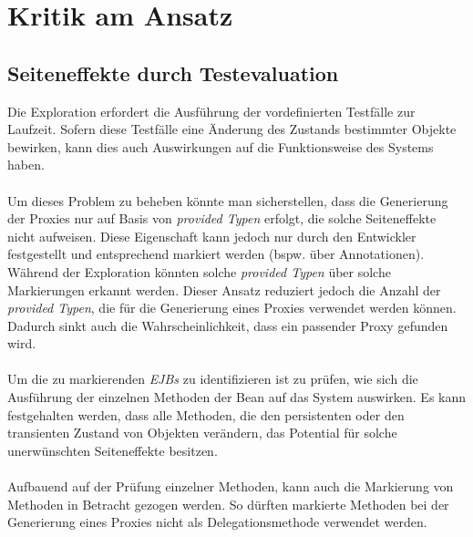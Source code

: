 \section{Kritik am Ansatz}\label{sec_discApproach}

\subsection{Seiteneffekte durch Testevaluation}\label{sec_sideeffects}
Die Exploration erfordert die Ausführung der vordefinierten Testfälle zur Laufzeit. Sofern diese Testfälle eine Änderung des Zustands bestimmter Objekte bewirken, kann dies auch Auswirkungen auf die Funktionsweise des Systems haben. 
\\\\
Um dieses Problem zu beheben könnte man sicherstellen, dass die Generierung der Proxies nur auf Basis von \emph{provided Typen} erfolgt, die solche Seiteneffekte nicht aufweisen. Diese Eigenschaft kann jedoch nur durch den Entwickler festgestellt und entsprechend markiert werden (bspw. über Annotationen). Während der Exploration könnten solche \emph{provided Typen} über solche Markierungen erkannt werden. Dieser Ansatz reduziert jedoch die Anzahl der \emph{provided Typen}, die für die Generierung eines Proxies verwendet werden können. Dadurch sinkt auch die Wahrscheinlichkeit, dass ein passender Proxy gefunden wird.
\\\\
Um die zu markierenden \emph{EJBs} zu identifizieren ist zu prüfen, wie sich die Ausführung der einzelnen Methoden der Bean auf das System auswirken. Es kann festgehalten werden, dass alle Methoden, die den persistenten oder den transienten Zustand von Objekten verändern, das Potential für solche unerwünschten Seiteneffekte besitzen. 
\\\\
Aufbauend auf der Prüfung einzelner Methoden, kann auch die Markierung von Methoden in Betracht gezogen werden. So dürften markierte Methoden bei der Generierung eines Proxies nicht als Delegationsmethode verwendet werden.
